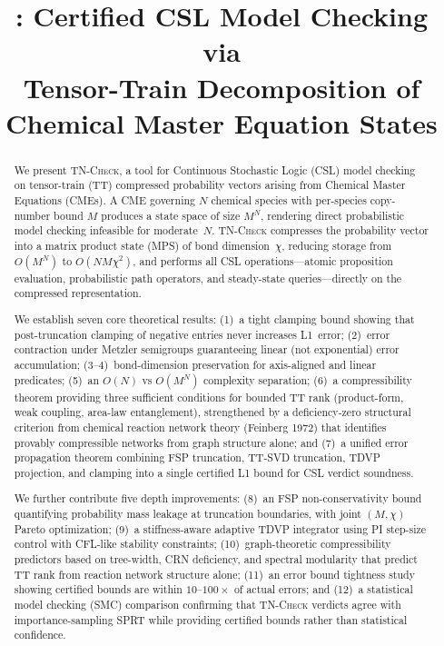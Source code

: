 \documentclass[11pt]{article}
\title{\tncheck{}: Certified CSL Model Checking via \\
Tensor-Train Decomposition of Chemical Master Equation States}
\date{}
\newcommand{\tncheck}{\textsc{TN-Check}}
\begin{document}
\maketitle

\begin{abstract}
We present \tncheck{}, a tool for Continuous Stochastic Logic (CSL)
model checking on tensor-train (TT) compressed probability vectors
arising from Chemical Master Equations (CMEs).
A CME governing $N$ chemical species with per-species copy-number bound $M$
produces a state space of size $M^N$, rendering direct probabilistic
model checking infeasible for moderate~$N$.
\tncheck{} compresses the probability vector into a matrix product state
(MPS) of bond dimension~$\chi$, reducing storage from $O(M^N)$ to
$O(NM\chi^2)$, and performs all CSL operations---atomic proposition
evaluation, probabilistic path operators, and steady-state
queries---directly on the compressed representation.

We establish seven core theoretical results: (1)~a tight clamping bound
showing that post-truncation clamping of negative entries never increases
L1~error; (2)~error contraction under Metzler semigroups guaranteeing
linear (not exponential) error accumulation;
(3--4)~bond-dimension preservation for axis-aligned and linear predicates;
(5)~an $O(N)$ vs $O(M^N)$ complexity separation;
(6)~a compressibility theorem providing three sufficient conditions for
bounded TT rank (product-form, weak coupling, area-law entanglement),
strengthened by a deficiency-zero structural criterion from chemical
reaction network theory (Feinberg 1972) that identifies provably
compressible networks from graph structure alone;
and (7)~a unified error propagation theorem combining FSP truncation,
TT-SVD truncation, TDVP projection, and clamping into a single
certified L1 bound for CSL verdict soundness.

We further contribute five depth improvements:
(8)~an FSP non-conservativity bound quantifying probability mass leakage
at truncation boundaries, with joint $(M,\chi)$ Pareto optimization;
(9)~a stiffness-aware adaptive TDVP integrator using PI step-size
control with CFL-like stability constraints;
(10)~graph-theoretic compressibility predictors based on tree-width,
CRN deficiency, and spectral modularity that predict TT rank from
reaction network structure alone;
(11)~an error bound tightness study showing certified bounds are
within $10$--$100\times$ of actual errors;
and (12)~a statistical model checking (SMC) comparison confirming that
\tncheck{} verdicts agree with importance-sampling SPRT while providing
certified bounds rather than statistical confidence.


\end{abstract}
\end{document}
